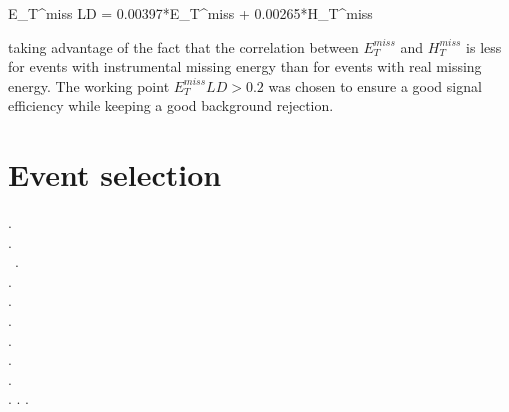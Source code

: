 \beqn
E_T^{miss} LD = 0.00397*E_T^{miss} + 0.00265*H_T^{miss}
\eeqn

\noindent taking advantage of the fact that the correlation between $E_T^{miss}$ and  $H_T^{miss}$ is less for events with instrumental missing energy than for events with real missing energy. The working point $E_T^{miss} LD > 0.2$ was chosen to ensure a good signal efficiency while keeping a good background rejection.



























































\section{Event selection}




.\\
.\\\
.\\
.\\
.\\
.\\
.\\
.\\
.\\
.
.
.











